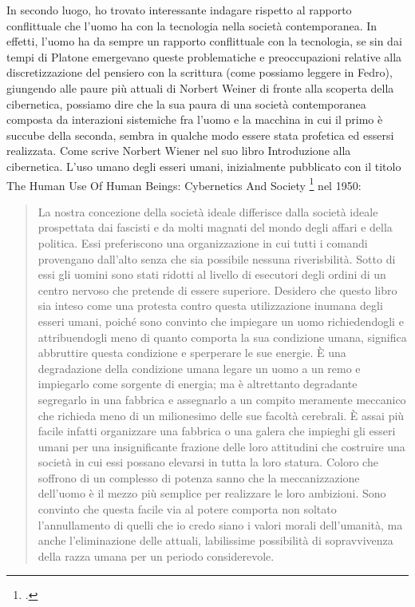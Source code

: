In secondo luogo, ho trovato interessante indagare rispetto al rapporto conflittuale che l'uomo ha con la tecnologia
nella società contemporanea. 
In effetti, l'uomo ha da sempre un rapporto conflittuale con la tecnologia,
se sin dai tempi di Platone emergevano queste problematiche e preoccupazioni
relative alla discretizzazione del pensiero con la scrittura
(come possiamo leggere in Fedro), 
giungendo alle paure più attuali di Norbert Weiner di fronte
alla scoperta della cibernetica, possiamo dire che la sua paura di una società contemporanea 
composta da interazioni sistemiche fra l'uomo e la macchina
in cui il primo è succube della seconda, sembra in qualche modo essere stata profetica ed essersi realizzata.
Come scrive Norbert Wiener nel suo libro Introduzione alla cibernetica. L'uso umano degli esseri umani,
inizialmente pubblicato con il titolo The Human Use Of Human Beings: Cybernetics And Society \footcite{wiener_introduzione_nodate}
nel 1950:

\begin{quote}
    La nostra concezione della società ideale differisce dalla società ideale
    prospettata dai fascisti e da molti magnati del mondo degli affari 
    e della politica.
    Essi preferiscono una organizzazione in cui tutti i comandi
    provengano dall'alto senza che sia possibile nessuna riverisbilità.
    Sotto di essi gli uomini sono stati ridotti al livello di esecutori degli ordini
    di un centro nervoso che pretende di essere superiore.
    Desidero che questo libro sia inteso come una protesta contro questa
    utilizzazione inumana degli esseri umani, poiché sono convinto che impiegare
    un uomo richiedendogli e attribuendogli meno di quanto comporta la sua condizione umana,
    significa abbruttire questa condizione e sperperare le sue energie.
    È una degradazione della condizione umana legare un uomo a un remo e impiegarlo come
    sorgente di energia; ma è altrettanto degradante segregarlo in una fabbrica
    e assegnarlo a un compito meramente meccanico che richieda meno di un milionesimo
    delle sue facoltà cerebrali. È assai più facile infatti
    organizzare una fabbrica o una galera che impieghi gli esseri umani
    per una insignificante frazione delle loro attitudini che costruire una 
    società in cui essi possano elevarsi in tutta la loro statura.
    Coloro che soffrono di un complesso di potenza sanno che la meccanizzazione 
    dell'uomo è il mezzo più semplice per realizzare le loro ambizioni.
    Sono convinto che questa facile via al potere comporta non soltato l'annullamento 
    di quelli che io credo siano i valori morali dell'umanità,
    ma anche l'eliminazione delle attuali, labilissime possibilità di
    sopravvivenza della razza umana per un periodo considerevole.
\end{quote}

